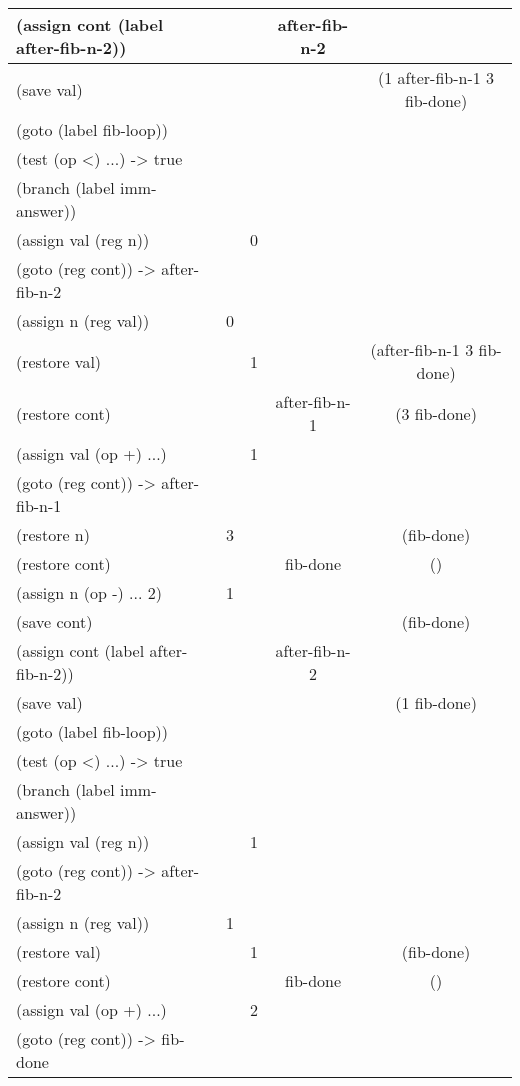 \begin{exe}[5.5]
\begin{longtable}{|l|c|c|c|c|}
        (assign cont (label after-fib-n-2)) &&& after-fib-n-2 & \\\hline
        (save val) &&&& (1 after-fib-n-1 3 fib-done) \\\hline
        (goto (label fib-loop)) &&&& \\\hline
        (test (op <) ...) -> true &&&& \\\hline
        (branch (label imm-answer)) &&&& \\\hline
        (assign val (reg n)) && 0 && \\\hline
        (goto (reg cont)) -> after-fib-n-2 &&&& \\\hline
        (assign n (reg val)) & 0 &&& \\\hline
        (restore val) && 1 && (after-fib-n-1 3 fib-done) \\\hline
        (restore cont) &&& after-fib-n-1 & (3 fib-done) \\\hline
        (assign val (op +) ...) && 1 && \\\hline
        (goto (reg cont)) -> after-fib-n-1 &&&& \\\hline
        (restore n) & 3 &&& (fib-done) \\\hline
        (restore cont) &&& fib-done & () \\\hline
        (assign n (op -) ... 2) & 1 &&& \\\hline
        (save cont) &&&& (fib-done) \\\hline
        (assign cont (label after-fib-n-2)) &&& after-fib-n-2 & \\\hline
        (save val) &&&& (1 fib-done) \\\hline
        (goto (label fib-loop)) &&&& \\\hline
        (test (op <) ...) -> true &&&& \\\hline
        (branch (label imm-answer)) &&&& \\\hline
        (assign val (reg n)) && 1 && \\\hline
        (goto (reg cont)) -> after-fib-n-2 &&&& \\\hline
        (assign n (reg val)) & 1 &&& \\\hline
        (restore val) && 1 && (fib-done) \\\hline
        (restore cont) &&& fib-done & () \\\hline
        (assign val (op +) ...) && 2 && \\\hline
        (goto (reg cont)) -> fib-done &&&& \\\hline
    \end{longtable}
\end{exe}

